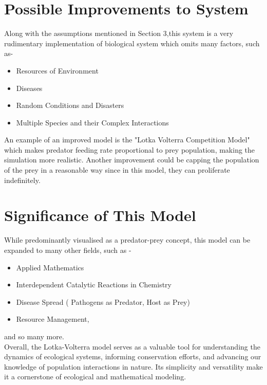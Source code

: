 \documentclass{article}
\begin{document}
\section{Possible Improvements to System}
Along with the assumptions mentioned in Section 3,this system is  a very rudimentary implementation of biological system which omits many factors, such as- 
\begin{itemize}
    \item Resources of Environment 
    \item Diseases
    \item Random Conditions and Disasters
    \item Multiple Species and their Complex Interactions
\end{itemize}
An example of an improved model is the "Lotka Volterra Competition Model" which makes predator feeding rate proportional to prey population, making the simulation more realistic. Another improvement could be capping the population of the prey in a reasonable way since in this model, they can proliferate indefinitely.

\section{Significance of This Model}
While predominantly visualised as a predator-prey concept, this model can be expanded to many other fields, such as - 
\begin{itemize}
    \item Applied Mathematics 
    \item Interdependent Catalytic Reactions in Chemistry
    \item Disease Spread ( Pathogens as Predator, Host as Prey)
    \item Resource Management,
\end{itemize}
and so many more. \\
Overall, the Lotka-Volterra model serves as a valuable tool for understanding the dynamics of ecological systems, informing conservation efforts, and advancing our knowledge of population interactions in nature. Its simplicity and versatility make it a cornerstone of ecological and mathematical modeling.
\end{document}
